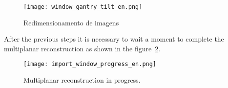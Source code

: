\begin{figure}[!htb]
\centering
\texttt{[image: window\_gantry\_tilt\_en.png]}
\caption{Redimensionamento de imagens}
\label{fig:gantry_tilt}
\end{figure}


After the previous steps it is necessary to wait a moment to complete the multiplanar reconstruction as shown in the figure~\ref{fig:import_bmp_mpr_pt.png}.

\begin{figure}[!htb]
\centering
\texttt{[image: import\_window\_progress\_en.png]}
\caption{Multiplanar reconstruction in progress.}
\label{fig:import_bmp_mpr_pt.png}
\end{figure}
